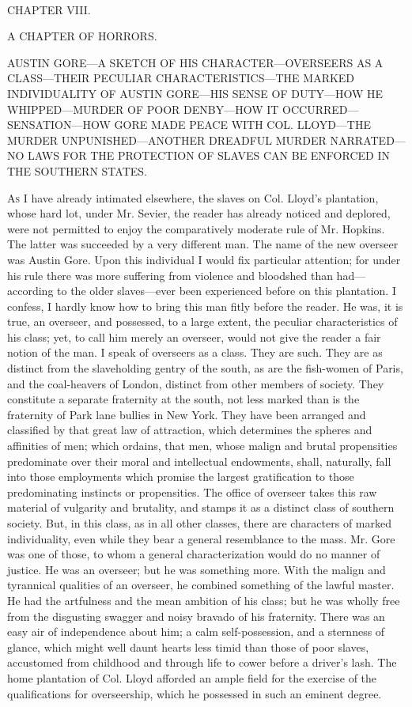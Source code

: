 {\protect\hypertarget{119}{}{}}

~

{CHAPTER VIII.}

A CHAPTER OF HORRORS.

{AUSTIN GORE---A SKETCH OF HIS CHARACTER---OVERSEERS AS A CLASS---THEIR
PECULIAR CHARACTERISTICS---THE MARKED INDIVIDUALITY OF AUSTIN GORE---HIS
SENSE OF DUTY---HOW HE WHIPPED---MURDER OF POOR DENBY---HOW IT
OCCURRED---SENSATION---HOW GORE MADE PEACE WITH COL. LLOYD---THE MURDER
UNPUNISHED---ANOTHER DREADFUL MURDER NARRATED---NO LAWS FOR THE
PROTECTION OF SLAVES CAN BE ENFORCED IN THE SOUTHERN STATES.}

\textsc{As} I have already intimated elsewhere, the slaves on Col.
Lloyd's plantation, whose hard lot, under Mr. Sevier, the reader has
already noticed and deplored, were not permitted to enjoy the
comparatively moderate rule of Mr. Hopkins. The latter was succeeded by
a very different man. The name of the new overseer was Austin Gore. Upon
this individual I would fix particular attention; for under his rule
there was more suffering from violence and bloodshed than
had---according to the older slaves---ever been experienced before on
this plantation. I confess, I hardly know how to bring this man fitly
before the reader. He was, it is true, an overseer, and possessed, to a
large extent, the peculiar characteristics of his class; yet, to call
him merely an overseer, would not give the reader a fair notion of the
man. I speak of overseers as a class. They are such. They are as
distinct from the slaveholding gentry of the south, as are the
fish-women of Paris, and the coal-heavers of
{\protect\hypertarget{120}{}{}}London, distinct from other members of
society. They constitute a separate fraternity at the south, not less
marked than is the fraternity of Park lane bullies in New York. They
have been arranged and classified by that great law of attraction, which
determines the spheres and affinities of men; which ordains, that men,
whose malign and brutal propensities predominate over their moral and
intellectual endowments, shall, naturally, fall into those employments
which promise the largest gratification to those predominating instincts
or propensities. The office of overseer takes this raw material of
vulgarity and brutality, and stamps it as a distinct class of southern
society. But, in this class, as in all other classes, there are
characters of marked individuality, even while they bear a general
resemblance to the mass. Mr. Gore was one of those, to whom a general
characterization would do no manner of justice. He was an overseer; but
he was something more. With the malign and tyrannical qualities of an
overseer, he combined something of the lawful master. He had the
artfulness and the mean ambition of his class; but he was wholly free
from the disgusting swagger and noisy bravado of his fraternity. There
was an easy air of independence about him; a calm self-possession, and a
sternness of glance, which might well daunt hearts less timid than those
of poor slaves, accustomed from childhood and through life to cower
before a driver's lash. The home plantation of Col. Lloyd afforded an
ample field for the exercise of the qualifications for overseership,
which he possessed in such an eminent degree.

